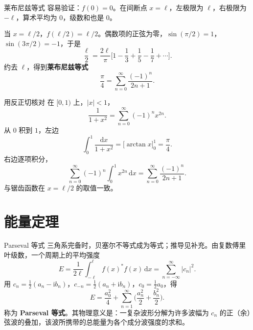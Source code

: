 \documentclass[fontset=windows, chinese, 10pt, xcolor=dvipsnames]{beamer}
\begin{document}
\begin{frame}{莱布尼兹等式}
  容易验证：$f(0)=0$。在间断点 $x=\ell$，左极限为 $\ell$，右极限为 $-\ell$，算术平均为 $0$，级数和也是 $0$。
  \vspace{0.4em}

  当 $x=\ell/2$，$f(\ell/2)=\ell/2$。偶数项的正弦为零，$\sin(\pi/2)=1$，$\sin(3\pi/2)=-1$，于是
  \begin{equation*}
    \frac{\ell}{2}
    =\frac{2\ell}{\pi}\Biggl[
      1-\frac13+\frac15-\frac17+\cdots
    \Biggr].
  \end{equation*}
  约去 $\ell$，得到\textbf{莱布尼兹等式}
  \begin{equation*}
    \frac{\pi}{4}
    =\sum_{n=0}^{\infty}\frac{(-1)^n}{2n+1}.
  \end{equation*}
\end{frame}

\begin{frame}{用反正切核对}
  在 $[0,1)$ 上，$|x|<1$，
  \begin{equation*}
    \frac{1}{1+x^2}
    =\sum_{n=0}^{\infty}(-1)^n x^{2n}.
  \end{equation*}
  从 $0$ 积到 $1$，左边
  \begin{equation*}
    \int_0^1\frac{\mathrm{d}x}{1+x^2}
    =\bigl[\arctan x\bigr]_0^1
    =\frac{\pi}{4}.
  \end{equation*}
  右边逐项积分，
  \begin{equation*}
    \sum_{n=0}^{\infty}(-1)^n\int_0^1 x^{2n}\,\mathrm{d}x
    =\sum_{n=0}^{\infty}\frac{(-1)^n}{2n+1}.
  \end{equation*}
  与锯齿函数在 $x=\ell/2$ 的取值一致。
\end{frame}

\section{能量定理}

\begin{frame}{Parseval 等式}
  三角系完备时，贝塞尔不等式成为等式；推导见补充。由复数傅里叶级数，一个周期上的平均强度
  \begin{equation*}
    E=\frac{1}{2\ell}\int_{-\ell}^{\ell} f(x)^* f(x)\,\mathrm{d}x
    =\sum_{n=-\infty}^{\infty}|c_n|^2.
  \end{equation*}
  用 $c_n=\tfrac12(a_n-\mathrm{i} b_n)$，$c_{-n}=\tfrac12(a_n+\mathrm{i} b_n)$，$c_0=\tfrac12 a_0$，得
  \begin{equation*}
    E=\frac{a_0^2}{4}
      +\sum_{n=1}^{\infty}
        \Biggl(\frac{a_n^2}{2}+\frac{b_n^2}{2}\Biggr).
  \end{equation*}
  称为 \textbf{Parseval 等式}。其物理意义是：一复杂波形分解为许多波幅为 $c_n$ 的正（余）弦波的叠加，该波所携带的总能量为各个成分波强度的求和。
\end{frame}
\end{document}
